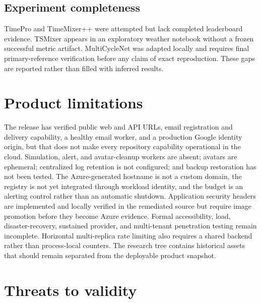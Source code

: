 \subsection{Experiment completeness}

TimePro and TimeMixer++ were attempted but lack completed leaderboard evidence. TSMixer appears in an exploratory weather notebook without a frozen successful metric artifact. MultiCycleNet was adapted locally and requires final primary-reference verification before any claim of exact reproduction. These gaps are reported rather than filled with inferred results.

\section{Product limitations}

The release has verified public web and API URLs, email registration and delivery capability, a healthy email worker, and a production Google identity origin, but that does not make every repository capability operational in the cloud. Simulation, alert, and avatar-cleanup workers are absent; avatars are ephemeral; centralized log retention is not configured; and backup restoration has not been tested. The Azure-generated hostname is not a custom domain, the registry is not yet integrated through workload identity, and the budget is an alerting control rather than an automatic shutdown. Application security headers are implemented and locally verified in the remediated source but require image promotion before they become Azure evidence. Formal accessibility, load, disaster-recovery, sustained provider, and multi-tenant penetration testing remain incomplete. Horizontal multi-replica rate limiting also requires a shared backend rather than process-local counters. The research tree contains historical assets that should remain separated from the deployable product snapshot.

\section{Threats to validity}

